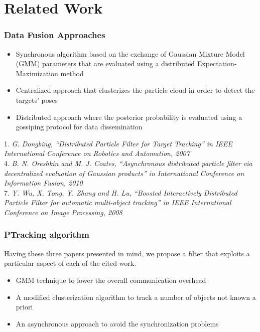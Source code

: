 \section{Related Work}

\begin{frame}
	\frametitle{Data Fusion Approaches}
	
	\begin{itemize}
		\item Synchronous algorithm based on the exchange of Gaussian Mixture Model (GMM) parameters that are
			  evaluated using a distributed Expectation-Maximization method \cite{Gu07}
		\vspace{0.2cm}
		\item Centralized approach that clusterizes the particle cloud in order to detect the targets' poses
			  \cite{Wu08}
		\vspace{0.2cm}
		\item Distributed approach where the posterior probability is evaluated using a gossiping protocol for data
			  dissemination \cite{Oreshkin10}
	\end{itemize}
	
	\vspace{0.4cm}
	
	\tiny 1. \emph{G. Dongbing, ``Distributed Particle Filter for Target Tracking'' in IEEE International Conference on Robotics and Automation, 2007}\\
	\vspace{0.2cm}
	\tiny 4. \emph{B. N. Oreshkin and M. J. Coates, ``Asynchronous distributed particle filter via decentralized evaluation of Gaussian products'' in International Conference on Information Fusion, 2010}\\
	\vspace{0.2cm}
	\tiny 7. \emph{Y. Wu, X. Tong, Y. Zhang and H. Lu, ``Boosted Interactively Distributed Particle Filter for automatic multi-object tracking'' in IEEE International Conference on Image Processing, 2008}\\
\end{frame}

\begin{frame}
	\frametitle{PTracking algorithm}
	
	\large
	
	Having these three papers presented in mind, we propose a filter that exploits a particular aspect of each of the
	cited work.
	\vspace{0.2cm}
	\begin{itemize}
		\item GMM technique to lower the overall communication overhead
		\vspace{0.2cm}
		\item A modified clusterization algorithm to track a number of objects not known a priori
		\vspace{0.2cm}
		\item An asynchronous approach to avoid the synchronization problems
	\end{itemize}
\end{frame}
